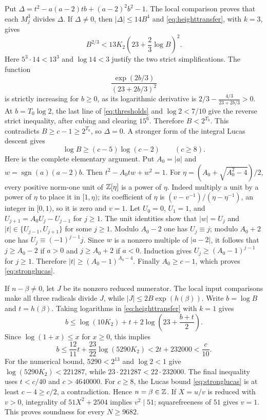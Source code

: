 \documentclass[11pt,a4paper]{article}
\begin{document}
Put $\Delta=t^2-a(a-2)tb+(a-2)^2b^2-1$.
The local comparison proves that each $M_j^3$ divides $\Delta$.
If $\Delta\ne0$, then $|\Delta|\le14B^4$ and
\eqref{eq:heighttransfer}, with $k=3$, gives
\[
 B^{2/3}<13K_2\left(23+\frac23\log B\right)^2.
\]
Here $5^3\cdot14<13^3$ and $\log14<3$ justify the two
strict simplifications. The function
\[
 \frac{\exp(2b/3)}{(23+2b/3)^2}
\]
is strictly increasing for $b\ge0$, as its logarithmic derivative is
$2/3-\frac{4/3}{23+2b/3}>0$. At $b=T_0\log2$, the last line of
\eqref{eq:thresholds} and $\log2<7/10$ give the reverse strict
inequality, after cubing and clearing $15^6$. Therefore $B<2^{T_0}$.
This contradicts $B\ge c-1\ge2^{T_0}$, so $\Delta=0$.
A stronger form of the integral Lucas descent gives
\begin{equation}\label{eq:stronglucas}
              \log B\ge(c-5)\log(c-2)\qquad(c\ge8).
\end{equation}
Here is the complete elementary argument. Put $A_0=|a|$ and
$w=\operatorname{sgn}(a)(a-2)b$. Then
$t^2-A_0tw+w^2=1$. For
$\eta=(A_0+\sqrt{A_0^2-4})/2$, every positive norm-one unit of
$\mathbb Z[\eta]$ is a power of $\eta$. Indeed multiply a unit by a
power of $\eta$ to place it in $[1,\eta)$; its coefficient of
$\eta$ is $(v-v^{-1})/(\eta-\eta^{-1})$, an integer in $[0,1)$,
so it is zero and $v=1$.
Let $U_0=0$, $U_1=1$, and $U_{j+1}=A_0U_j-U_{j-1}$ for $j\ge1$.
The unit identities show that $|w|=U_j$ and
$|t|\in\{U_{j-1},U_{j+1}\}$ for some $j\ge1$.
Modulo $A_0-2$ one has $U_j\equiv j$; modulo $A_0+2$ one has
$U_j\equiv(-1)^{j-1}j$. Since $w$ is a nonzero multiple of
$|a-2|$, it follows that $j\ge A_0-2$ if $a>0$ and
$j\ge A_0+2$ if $a<0$. Induction gives
$U_j\ge(A_0-1)^{j-1}$ for $j\ge1$. Therefore
$|t|\ge(A_0-1)^{A_0-4}$. Finally $A_0\ge c-1$, which proves
\eqref{eq:stronglucas}.

If $n-\beta\ne0$, let $J$ be its nonzero reduced numerator.
The local input comparisons make all three radicals divide $J$,
while $|J|\le2B\exp(h(\beta))$. Write $b=\log B$ and
$t=h(\beta)$. Taking logarithms in \eqref{eq:heighttransfer}
with $k=1$ gives
\[
 b\le\log(10K_2)+t+2\log\left(23+\frac{b+t}{2}\right).
\]
Since $\log(1+x)\le x$ for $x\ge0$, this implies
\[
 b\le\frac{12}{11}t+\frac{23}{22}\log(5290K_2)
       <2t+232000<\frac c{10}.
\]
For the numerical bound, $5290<2^{13}$ and $\log2<1$ give
$\log(5290K_2)<221287$, while
$23\cdot221287<22\cdot232000$. The final inequality uses
$t<c/40$ and $c>4640000$. For $c\ge8$, the Lucas bound
\eqref{eq:stronglucas} is at least $c-4\ge c/2$, a contradiction.
Hence $n=\beta\in\mathbb Z$.
If $X=u/v$ is reduced with $v>0$, integrality of $51X^2+2504$
implies $v^2\mid51$; squarefreeness of $51$ gives $v=1$.
This proves soundness for every $N\ge9682$.
\end{document}

